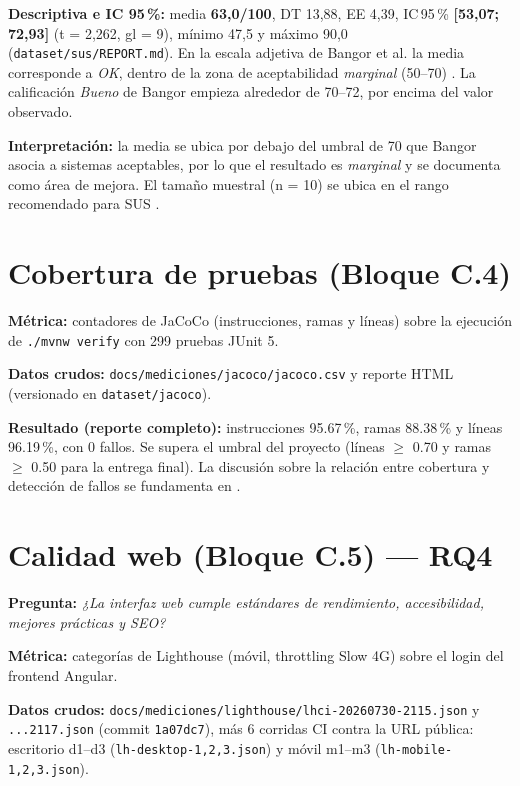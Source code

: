 \textbf{Descriptiva e IC 95\,\%:} media \textbf{63,0/100}, DT 13,88, EE 4,39, IC\,95\,\%
\textbf{[53,07; 72,93]} (t = 2,262, gl = 9), mínimo 47,5 y máximo 90,0
(\texttt{dataset/sus/REPORT.md}). En la escala adjetiva de Bangor et
al. \cite{bangor2009,bangor2008} la media corresponde a \emph{OK}, dentro de la
zona de aceptabilidad \emph{marginal} (50--70) \cite{lewis2009}. La
calificación \emph{Bueno} de Bangor empieza alrededor de 70--72, por
encima del valor observado.

\textbf{Interpretación:} la media se ubica por debajo del umbral de 70 que Bangor
asocia a sistemas aceptables, por lo que el resultado es \emph{marginal} y se
documenta como área de mejora. El tamaño muestral (n = 10) se ubica en el rango
recomendado para SUS \cite{kortum2013}.

\section{Cobertura de pruebas (Bloque C.4)}
\label{sec:cobertura}

\textbf{Métrica:} contadores de JaCoCo (instrucciones, ramas y líneas) sobre la
ejecución de \texttt{./mvnw verify} con 299 pruebas JUnit 5.

\textbf{Datos crudos:} \texttt{docs/mediciones/jacoco/jacoco.csv} y reporte HTML
(versionado en \texttt{dataset/jacoco}).

\textbf{Resultado (reporte completo):} instrucciones 95.67\,\%,
ramas 88.38\,\% y líneas 96.19\,\%, con 0 fallos. Se supera el umbral del proyecto
(líneas $\ge$ 0.70 y ramas $\ge$ 0.50 para la entrega final). La discusión sobre la relación entre cobertura y detección de fallos se
fundamenta en \cite{inozemtseva2014,gopinath2014,gligoric2013,ivankovic2019}.

\section{Calidad web (Bloque C.5) — RQ4}
\label{sec:lighthouse}

\textbf{Pregunta:} \emph{¿La interfaz web cumple estándares de rendimiento,
accesibilidad, mejores prácticas y SEO?}

\textbf{Métrica:} categorías de Lighthouse \cite{lighthouse} (móvil, throttling Slow 4G)
sobre el login del frontend Angular.

\textbf{Datos crudos:} \texttt{docs/mediciones/lighthouse/lhci-20260730-2115.json} y
\texttt{...2117.json} (commit \texttt{1a07dc7}), más 6 corridas CI contra la URL
pública: escritorio d1--d3 (\texttt{lh-desktop-{1,2,3}.json}) y móvil m1--m3
(\texttt{lh-mobile-{1,2,3}.json}).

